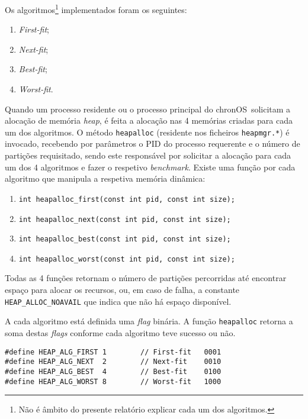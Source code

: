 \documentclass[10pt,oneside]{estiloUBI}
\newcommand{\chronOS}{\textsf{chronOS}}
\begin{document}
	Os algoritmos\footnote{Não é âmbito do presente relatório explicar cada um dos algoritmos.} implementados foram os seguintes:
	
	\begin{enumerate}
		\item \textit{First-fit};
		\item \textit{Next-fit};
		\item \textit{Best-fit};
		\item \textit{Worst-fit}.
	\end{enumerate}

	Quando um processo residente ou o processo principal do \chronOS~solicitam a alocação de memória \textit{heap}, é feita a alocação nas 4 memórias criadas para cada um dos algoritmos. O método \verb|heapalloc| (residente nos ficheiros \verb|heapmgr.*|) é invocado, recebendo por parâmetros o PID do processo requerente e o número de partições requisitado, sendo este responsável por solicitar a alocação para cada um dos 4 algoritmos e fazer o respetivo \textit{benchmark}. Existe uma função por cada algoritmo que manipula a respetiva memória dinâmica:
	
	\begin{enumerate}
		\item \texttt{int heapalloc_first(const int pid, const int size);}
		\item \texttt{int heapalloc_next(const int pid, const int size);}
		\item \texttt{int heapalloc_best(const int pid, const int size);}
		\item \texttt{int heapalloc_worst(const int pid, const int size);}
	\end{enumerate}
	
	Todas as 4 funções retornam o número de partições percorridas até encontrar espaço para alocar os recursos, ou, em caso de falha, a constante \verb|HEAP_ALLOC_NOAVAIL| que indica que não há espaço disponível.
	
	A cada algoritmo está definida uma \textit{flag} binária. A função \verb|heapalloc| retorna a soma destas \textit{flags} conforme cada algoritmo teve sucesso ou não.
	
	\begin{verbatim}
#define HEAP_ALG_FIRST 1        // First-fit   0001
#define HEAP_ALG_NEXT  2        // Next-fit    0010
#define HEAP_ALG_BEST  4        // Best-fit    0100
#define HEAP_ALG_WORST 8        // Worst-fit   1000
	\end{verbatim}
	
\end{document}
